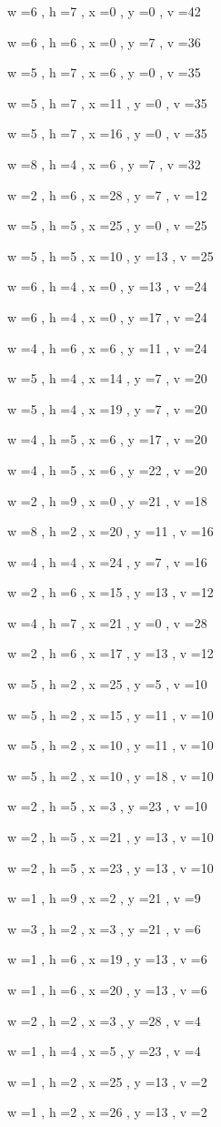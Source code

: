 \documentclass[11pt]{article}
\begin{document}
w =6 , h =7 , x =0 , y =0 , v =42
\par
w =6 , h =6 , x =0 , y =7 , v =36
\par
w =5 , h =7 , x =6 , y =0 , v =35
\par
w =5 , h =7 , x =11 , y =0 , v =35
\par
w =5 , h =7 , x =16 , y =0 , v =35
\par
w =8 , h =4 , x =6 , y =7 , v =32
\par
w =2 , h =6 , x =28 , y =7 , v =12
\par
w =5 , h =5 , x =25 , y =0 , v =25
\par
w =5 , h =5 , x =10 , y =13 , v =25
\par
w =6 , h =4 , x =0 , y =13 , v =24
\par
w =6 , h =4 , x =0 , y =17 , v =24
\par
w =4 , h =6 , x =6 , y =11 , v =24
\par
w =5 , h =4 , x =14 , y =7 , v =20
\par
w =5 , h =4 , x =19 , y =7 , v =20
\par
w =4 , h =5 , x =6 , y =17 , v =20
\par
w =4 , h =5 , x =6 , y =22 , v =20
\par
w =2 , h =9 , x =0 , y =21 , v =18
\par
w =8 , h =2 , x =20 , y =11 , v =16
\par
w =4 , h =4 , x =24 , y =7 , v =16
\par
w =2 , h =6 , x =15 , y =13 , v =12
\par
w =4 , h =7 , x =21 , y =0 , v =28
\par
w =2 , h =6 , x =17 , y =13 , v =12
\par
w =5 , h =2 , x =25 , y =5 , v =10
\par
w =5 , h =2 , x =15 , y =11 , v =10
\par
w =5 , h =2 , x =10 , y =11 , v =10
\par
w =5 , h =2 , x =10 , y =18 , v =10
\par
w =2 , h =5 , x =3 , y =23 , v =10
\par
w =2 , h =5 , x =21 , y =13 , v =10
\par
w =2 , h =5 , x =23 , y =13 , v =10
\par
w =1 , h =9 , x =2 , y =21 , v =9
\par
w =3 , h =2 , x =3 , y =21 , v =6
\par
w =1 , h =6 , x =19 , y =13 , v =6
\par
w =1 , h =6 , x =20 , y =13 , v =6
\par
w =2 , h =2 , x =3 , y =28 , v =4
\par
w =1 , h =4 , x =5 , y =23 , v =4
\par
w =1 , h =2 , x =25 , y =13 , v =2
\par
w =1 , h =2 , x =26 , y =13 , v =2
\par
\newpage
\end{document}
